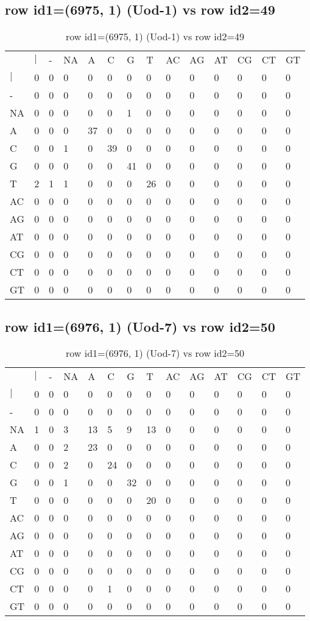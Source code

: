 \subsection{row id1=(6975, 1) (Uod-1) vs row id2=49}
\begin{center}
\begin{longtable}{|l|l|l|l|l|l|l|l|l|l|l|l|l|l|}
\caption{row id1=(6975, 1) (Uod-1) vs row id2=49} \label{table_dm198}\\
\hline
\\
\hline
&$|$&-&NA&A&C&G&T&AC&AG&AT&CG&CT&GT\\
$|$&0&0&0&0&0&0&0&0&0&0&0&0&0\\
-&0&0&0&0&0&0&0&0&0&0&0&0&0\\
NA&0&0&0&0&0&1&0&0&0&0&0&0&0\\
A&0&0&0&37&0&0&0&0&0&0&0&0&0\\
C&0&0&1&0&39&0&0&0&0&0&0&0&0\\
G&0&0&0&0&0&41&0&0&0&0&0&0&0\\
T&2&1&1&0&0&0&26&0&0&0&0&0&0\\
AC&0&0&0&0&0&0&0&0&0&0&0&0&0\\
AG&0&0&0&0&0&0&0&0&0&0&0&0&0\\
AT&0&0&0&0&0&0&0&0&0&0&0&0&0\\
CG&0&0&0&0&0&0&0&0&0&0&0&0&0\\
CT&0&0&0&0&0&0&0&0&0&0&0&0&0\\
GT&0&0&0&0&0&0&0&0&0&0&0&0&0\\
\hline
\end{longtable}
\end{center}

\subsection{row id1=(6976, 1) (Uod-7) vs row id2=50}
\begin{center}
\begin{longtable}{|l|l|l|l|l|l|l|l|l|l|l|l|l|l|}
\caption{row id1=(6976, 1) (Uod-7) vs row id2=50} \label{table_dm200}\\
\hline
\\
\hline
&$|$&-&NA&A&C&G&T&AC&AG&AT&CG&CT&GT\\
$|$&0&0&0&0&0&0&0&0&0&0&0&0&0\\
-&0&0&0&0&0&0&0&0&0&0&0&0&0\\
NA&1&0&3&13&5&9&13&0&0&0&0&0&0\\
A&0&0&2&23&0&0&0&0&0&0&0&0&0\\
C&0&0&2&0&24&0&0&0&0&0&0&0&0\\
G&0&0&1&0&0&32&0&0&0&0&0&0&0\\
T&0&0&0&0&0&0&20&0&0&0&0&0&0\\
AC&0&0&0&0&0&0&0&0&0&0&0&0&0\\
AG&0&0&0&0&0&0&0&0&0&0&0&0&0\\
AT&0&0&0&0&0&0&0&0&0&0&0&0&0\\
CG&0&0&0&0&0&0&0&0&0&0&0&0&0\\
CT&0&0&0&0&1&0&0&0&0&0&0&0&0\\
GT&0&0&0&0&0&0&0&0&0&0&0&0&0\\
\hline
\end{longtable}
\end{center}

